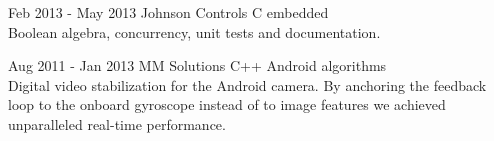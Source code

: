 \documentclass{tccv}
\begin{document}
\begin{eventlist}
\pagebreak
\item{Feb 2013 - May 2013}
     {Johnson Controls}
     {C embedded} \\
Boolean algebra, concurrency, unit tests and documentation.  \\

\item{Aug 2011 - Jan 2013}
     {MM Solutions}
     {C++ Android algorithms} \\
Digital video stabilization for the Android camera.
By anchoring the feedback loop to the onboard gyroscope instead of to image features we achieved unparalleled real-time performance.
\end{eventlist}
\end{document}
